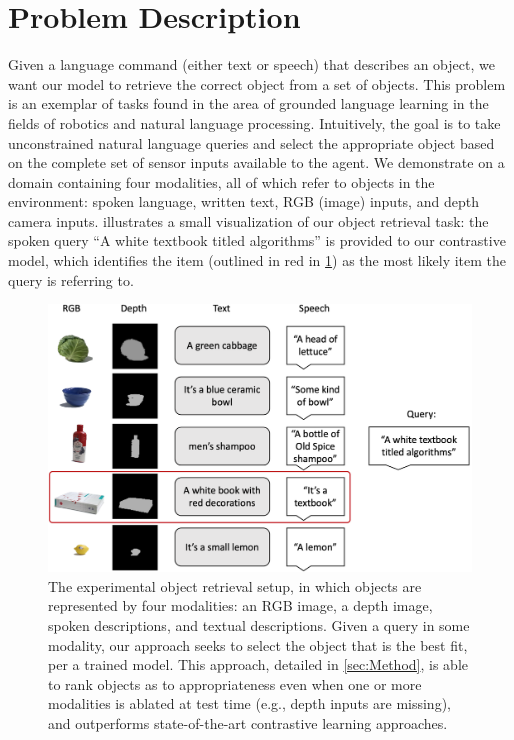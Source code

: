 \documentclass[10pt]{article} %
\begin{document}

\section{Problem Description}
\label{sec:Problem-Description}

Given a language command (either text or speech) that describes an object, we want our model to retrieve the correct object from a set of objects. This problem is an exemplar of tasks found in the area of grounded language learning in the fields of robotics and natural  language processing. Intuitively, the goal is to take unconstrained natural language queries and select the appropriate object based on the complete set of sensor inputs available to the agent. We demonstrate on a domain containing four modalities, all of which refer to objects in the environment: spoken language, written text, RGB (image) inputs, and depth camera inputs.  illustrates a small visualization of our object retrieval task: the spoken query ``A white textbook titled algorithms'' is provided to our contrastive model, which identifies the item 
(outlined in red in \cref{fig:experimental-setup}) 
as the most likely item the query is referring to.

\begin{figure}[tb]
\centering
\includegraphics[width=.75\columnwidth]{Figures/experiment-setup-rearranged.png}
\caption{
The experimental object retrieval setup, in which objects are represented by four modalities: an RGB image, a depth image, spoken descriptions, and textual descriptions. Given a query in some modality, our approach seeks to select the object that is the best fit, per a trained model. This approach, detailed in \cref{sec:Method}, is able to rank objects as to appropriateness even when one or more modalities is ablated at test time (e.g., depth inputs are missing), and outperforms state-of-the-art contrastive learning approaches.
}
\label{fig:experimental-setup}
\end{figure}
\end{document}
